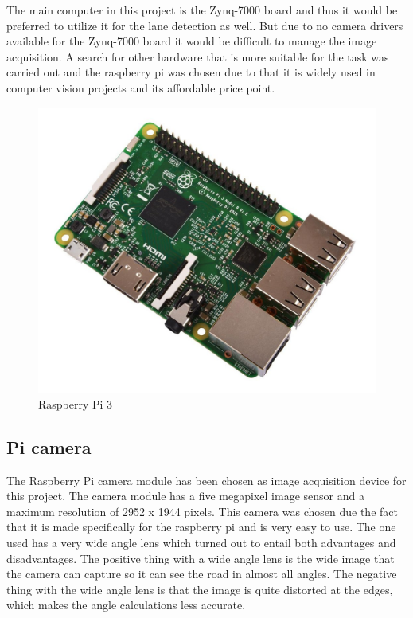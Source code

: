 The main computer in this project is the Zynq-7000 board and thus it would be preferred to utilize it for the lane detection as well. But due to no camera drivers available for the Zynq-7000 board it would be difficult to manage the image acquisition. A search for other hardware that is more suitable for the task was carried out and the raspberry pi was chosen due to that it is widely used in computer vision projects and its affordable price point.

\begin{figure}[H]
  \includegraphics[scale=0.3]{./img/rpi.jpg}
  \centering
  \caption{Raspberry Pi 3}
  \label{fig:RPI}
\end{figure}

\subsection{Pi camera}
The Raspberry Pi camera module has been chosen as image acquisition device for this project. The camera module has a five megapixel image sensor and a maximum resolution of 2952 x 1944 pixels. This camera was chosen due the fact that it is made specifically for the raspberry pi and is very easy to use. The one used has a very wide angle lens which turned out to entail both advantages and disadvantages. The positive thing with a wide angle lens is the wide image that the camera can capture so it can see the road in almost all angles. The negative thing with the wide angle lens is that the image is quite distorted at the edges, which makes the angle calculations less accurate. 



